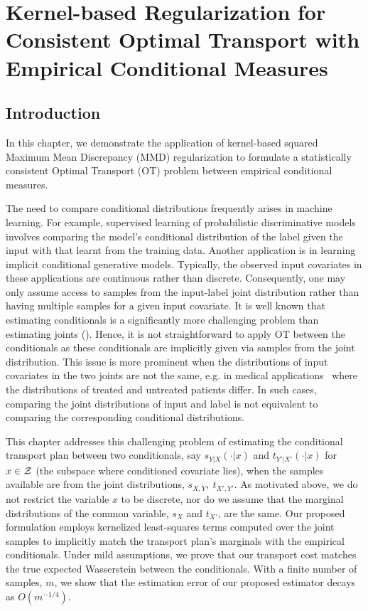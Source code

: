 \chapter{Kernel-based Regularization for\\ Consistent Optimal Transport with Empirical Conditional Measures}
\label{chap:ch3}
\section{Introduction}
In this chapter, we demonstrate the application of kernel-based squared Maximum Mean Discrepancy (MMD) regularization to formulate a statistically consistent Optimal Transport (OT) problem between empirical conditional measures.

The need to compare conditional distributions frequently arises in machine learning. For example, supervised learning of probabilistic discriminative models involves comparing the model’s conditional distribution of the label given the input with that learnt from the training data. Another application is in learning implicit conditional generative models. Typically, the observed input covariates in these applications are continuous rather than discrete. Consequently, one may only assume access to samples from the input-label joint distribution rather than having multiple samples for a given input covariate. It is well known that estimating conditionals is a significantly more challenging problem than estimating joints (\citep[Sec. 2]{LiNeykovBalakrishnan}). Hence, it is not straightforward to apply OT between the conditionals as these conditionals are implicitly given via samples from the joint distribution.  This issue is more prominent when the distributions of input covariates in the two joints are not the same, e.g. in medical applications~\citep{hahn2019atlantic} where the distributions of treated and untreated patients differ. In such cases, comparing the joint distributions of input and label is not equivalent to comparing the corresponding conditional distributions.

This chapter addresses this challenging problem of estimating the conditional transport plan between two conditionals, say $s_{Y|X}(\cdot|x)$ and $t_{Y'|X'}(\cdot|x)$ for $x\in \mathcal{Z}$ (the subspace where conditioned covariate lies), when the samples available are from the joint distributions, $s_{X, Y}, ~t_{X', Y'}$. As motivated above, we do not restrict the variable $x$ to be discrete, nor do we assume that the marginal distributions of the common variable, $s_X$ and $t_{X'}$, are the same. 
Our proposed formulation employs kernelized least-squares terms computed over the joint samples to implicitly match the transport plan's marginals with the empirical conditionals. Under mild assumptions, we prove that our transport cost matches the true expected Wasserstein between the conditionals. With a finite number of samples, $m$, we show that the estimation error of our proposed estimator decays as $O(m^{-1/4})$.


